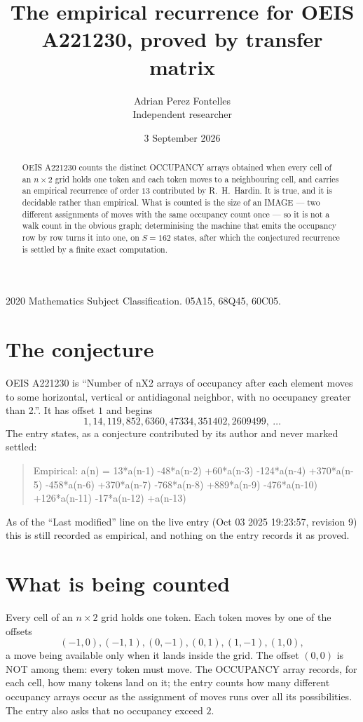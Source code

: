 \documentclass[11pt,a4paper]{article}
\title{The empirical recurrence for OEIS A221230, proved by transfer matrix}
\author{Adrian Perez Fontelles\\ \small Independent researcher}
\date{3 September 2026}
\theoremstyle{plain}
\theoremstyle{definition}
\begin{document}
\maketitle

\begin{abstract}
OEIS A221230 counts the distinct OCCUPANCY arrays obtained when every cell of an $n\times2$ grid
holds one token and each token moves to a neighbouring cell, and carries an empirical
recurrence of order $13$ contributed by R.~H.~Hardin. It is true, and it is decidable
rather than empirical. What is counted is the size of an IMAGE --- two different assignments of
moves with the same occupancy count once --- so it is not a walk count in the obvious graph;
determinising the machine that emits the occupancy row by row turns it into one, on $S=162$
states, after which the conjectured recurrence is settled by a finite exact computation.
\end{abstract}

\noindent\small 2020 Mathematics Subject Classification. 05A15, 68Q45, 60C05.\normalsize

\section{The conjecture}

OEIS A221230 is ``Number of nX2 arrays of occupancy after each element moves to some horizontal, vertical or antidiagonal neighbor, with no occupancy greater than 2.''. It has offset $1$ and begins
\[
1, 14, 119, 852, 6360, 47334, 351402, 2609499,\ \dots
\]
The entry states, as a conjecture contributed by its author and never marked settled:
\begin{quote}
Empirical: a(n) = 13*a(n-1) -48*a(n-2) +60*a(n-3) -124*a(n-4) +370*a(n-5) -458*a(n-6) +370*a(n-7) -768*a(n-8) +889*a(n-9) -476*a(n-10) +126*a(n-11) -17*a(n-12) +a(n-13)
\end{quote}
As of the ``Last modified'' line on the live entry (Oct 03 2025 19:23:57, revision 9) this is still
recorded as empirical, and nothing on the entry records it as proved.

\section{What is being counted}

Every cell of an $n\times2$ grid holds one token. Each token moves by one of the offsets
\[
(-1,0), (-1,1), (0,-1), (0,1), (1,-1), (1,0),
\]
a move being available only when it lands inside the grid. The offset $(0,0)$ is NOT among them: every token must move. The OCCUPANCY array
records, for each cell, how many tokens land on it; the entry counts how many different
occupancy arrays occur as the assignment of moves runs over all its possibilities. The entry also asks that no occupancy exceed $2$.
\end{document}
